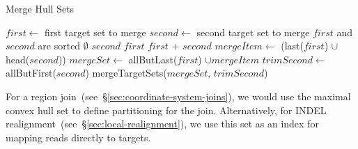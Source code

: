 \documentclass{acm_proc_article-sp}
\begin{document}
\begin{algorithm}
\caption{Merge Hull Sets}
\label{alg:join-targets}
\begin{algorithmic}
\STATE $first \leftarrow$ first target set to merge
\STATE $second \leftarrow$ second target set to merge
\REQUIRE $first$ and $second$ are sorted
\RETURN $\emptyset$
\RETURN $second$
\RETURN $first$
\ELSE
{}
\RETURN $first$ + $second$
\ELSE
\STATE $mergeItem \leftarrow$ (last($first$) $\cup$ head($second$))
\STATE $mergeSet \leftarrow$ allButLast($first$) $\cup mergeItem$
\STATE $trimSecond \leftarrow$ allButFirst($second$)
\RETURN mergeTargetSets($mergeSet$, $trimSecond$)
\ENDIF
\ENDIF
\end{algorithmic}
\end{algorithm}

For a region join~(see~\S\ref{sec:coordinate-system-joins}), we would use the maximal convex hull
set to define partitioning for the join. Alternatively, for INDEL
realignment~(see~\S\ref{sec:local-realignment}), we use this set as an index for mapping reads directly
to targets.

\balancecolumns
\end{document}
